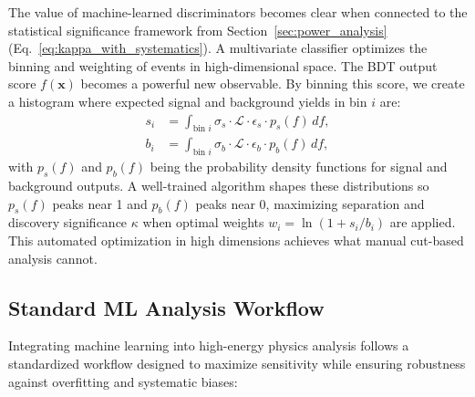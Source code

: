 The value of machine-learned discriminators becomes clear when connected to the statistical significance framework from Section~\ref{sec:power_analysis} (Eq.~\ref{eq:kappa_with_systematics}). A multivariate classifier optimizes the binning and weighting of events in high-dimensional space. The BDT output score $f(\mathbf{x})$ becomes a powerful new observable. By binning this score, we create a histogram where expected signal and background yields in bin $i$ are:
\begin{align}
s_i &= \int_{\text{bin } i} \sigma_s \cdot \mathcal{L} \cdot \epsilon_s \cdot p_s(f) \, df, \\
b_i &= \int_{\text{bin } i} \sigma_b \cdot \mathcal{L} \cdot \epsilon_b \cdot p_b(f) \, df,
\end{align}
with $p_s(f)$ and $p_b(f)$ being the probability density functions for signal and background outputs. A well-trained algorithm shapes these distributions so $p_s(f)$ peaks near 1 and $p_b(f)$ peaks near 0, maximizing separation and discovery significance $\kappa$ when optimal weights $w_i = \ln(1 + s_i/b_i)$ are applied. This automated optimization in high dimensions achieves what manual cut-based analysis cannot.

\subsection{Standard ML Analysis Workflow}
\label{ssec:ml_workflow}

Integrating machine learning into high-energy physics analysis follows a standardized workflow designed to maximize sensitivity while ensuring robustness against overfitting and systematic biases:

